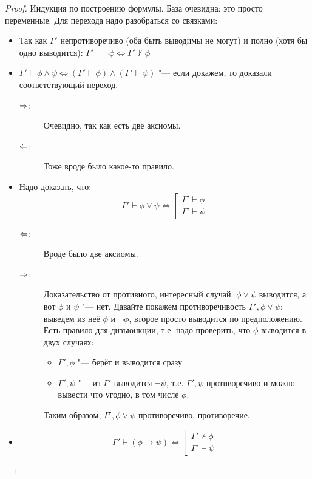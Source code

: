 \begin{proof}
	Индукция по построению формулы.
	База очевидна: это просто переменные.
	Для перехода надо разобраться со связками:
	\begin{itemize}
		\item
			Так как $\Gamma'$ непротиворечиво (оба быть выводимы не могут) и полно (хотя бы одно выводится): $\Gamma' \vdash \lnot \phi \iff \Gamma' \not\vdash \phi$
		\item
			$\Gamma' \vdash \phi \land \psi \iff (\Gamma' \vdash \phi) \land (\Gamma' \vdash \psi)$ "--- если докажем, то доказали соответствующий переход.
			\begin{description}
			\item[$\Rightarrow$:]
				Очевидно, так как есть две аксиомы.
			\item[$\Leftarrow$:]
				Тоже вроде было какое-то правило.
			\end{description}
		\item
			Надо доказать, что:
			\[
				\Gamma' \vdash \phi \lor \psi \iff
				\left[
					\begin{array}{l}
					\Gamma' \vdash \phi \\
					\Gamma' \vdash \psi
					\end{array}
				\right.
			\]
			\begin{description}
			\item[$\Leftarrow$:]
				Вроде было две аксиомы.
			\item[$\Rightarrow$:]
				Доказательство от противного, интересный случай:
				$\phi \lor \psi$ выводится, а вот $\phi$ и $\psi$ "--- нет.
				Давайте покажем противоречивость $\Gamma', \phi \lor \psi$: выведем из неё $\phi$ и $\lnot \phi$,
				второе просто выводится по предположению.
				Есть правило для дизъюнкции, т.е. надо проверить, что $\phi$ выводится в двух случаях:
				\begin{itemize}
					\item $\Gamma', \phi$ "--- берёт и выводится сразу
					\item $\Gamma', \psi$ "--- из $\Gamma'$ выводится $\lnot \psi$, т.е. $\Gamma', \psi$ противоречиво и можно вывести что угодно, в том числе $\phi$.
				\end{itemize}
				Таким образом, $\Gamma', \phi \lor \psi$ противоречиво, противоречие.
			\end{description}
		\item
			\begin{Exercise}
				\[
				\Gamma' \vdash (\phi \to \psi) \iff
				\left[
					\begin{array}{l}
					\Gamma' \not\vdash \phi \\
					\Gamma' \vdash \psi
					\end{array}
				\right.
				\]
			\end{Exercise}
	\end{itemize}
\end{proof}

